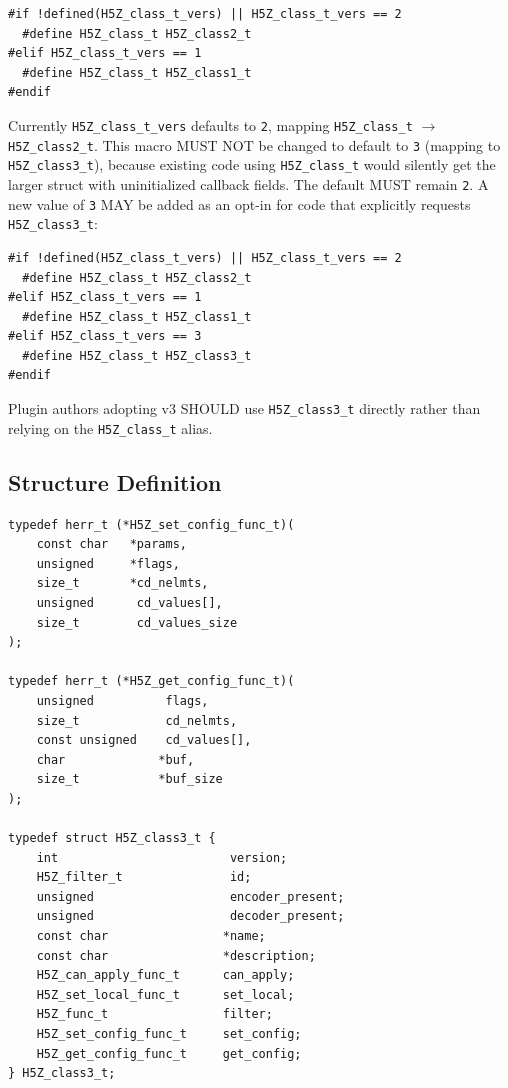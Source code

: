 \documentclass[../HDF5_RFC.tex]{subfiles}
\begin{document}
\begin{verbatim}
#if !defined(H5Z_class_t_vers) || H5Z_class_t_vers == 2
  #define H5Z_class_t H5Z_class2_t
#elif H5Z_class_t_vers == 1
  #define H5Z_class_t H5Z_class1_t
#endif
\end{verbatim}

Currently \texttt{H5Z\_class\_t\_vers} defaults to \texttt{2}, mapping
\texttt{H5Z\_class\_t} $\rightarrow$ \texttt{H5Z\_class2\_t}. This macro MUST NOT be changed to default to
\texttt{3} (mapping to \texttt{H5Z\_class3\_t}), because existing code using \texttt{H5Z\_class\_t}
would silently get the larger struct with uninitialized callback fields. The
default MUST remain \texttt{2}. A new value of \texttt{3} MAY be added as an opt-in for
code that explicitly requests \texttt{H5Z\_class3\_t}:

\begin{verbatim}
#if !defined(H5Z_class_t_vers) || H5Z_class_t_vers == 2
  #define H5Z_class_t H5Z_class2_t
#elif H5Z_class_t_vers == 1
  #define H5Z_class_t H5Z_class1_t
#elif H5Z_class_t_vers == 3
  #define H5Z_class_t H5Z_class3_t
#endif
\end{verbatim}

Plugin authors adopting v3 SHOULD use \texttt{H5Z\_class3\_t} directly rather than
relying on the \texttt{H5Z\_class\_t} alias.


\subsection{Structure Definition}
\label{sec:class3-struct}

\begin{verbatim}
typedef herr_t (*H5Z_set_config_func_t)(
    const char   *params,
    unsigned     *flags,
    size_t       *cd_nelmts,
    unsigned      cd_values[],
    size_t        cd_values_size
);

typedef herr_t (*H5Z_get_config_func_t)(
    unsigned          flags,
    size_t            cd_nelmts,
    const unsigned    cd_values[],
    char             *buf,
    size_t           *buf_size
);

typedef struct H5Z_class3_t {
    int                        version;
    H5Z_filter_t               id;
    unsigned                   encoder_present;
    unsigned                   decoder_present;
    const char                *name;
    const char                *description;
    H5Z_can_apply_func_t      can_apply;
    H5Z_set_local_func_t      set_local;
    H5Z_func_t                filter;
    H5Z_set_config_func_t     set_config;
    H5Z_get_config_func_t     get_config;
} H5Z_class3_t;
\end{verbatim}
\end{document}
